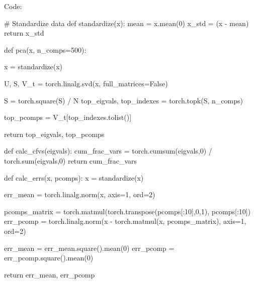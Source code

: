\documentclass[submit]{harvardml}
\begin{document}
Code:

\begin{python}
# Standardize data
def standardize(x):
    mean = x.mean(0)
    x_std = (x - mean)
    return x_std

def pca(x, n_comps=500):

    x = standardize(x)

    U, S, V_t = torch.linalg.svd(x, full_matrices=False)

    S = torch.square(S) / N
    top_eigvals, top_indexes = torch.topk(S, n_comps)

    top_pcomps = V_t[top_indexes.tolist()]
    
    return top_eigvals, top_pcomps


def calc_cfvs(eigvals):
    cum_frac_vars = torch.cumsum(eigvals,0) / torch.sum(eigvals,0)
    return cum_frac_vars





def calc_errs(x, pcomps):
    x = standardize(x)

    err_mean = torch.linalg.norm(x, axis=1, ord=2)

    pcomps_matrix = torch.matmul(torch.transpose(pcomps[:10],0,1), pcomps[:10])
    err_pcomp = torch.linalg.norm(x - torch.matmul(x, pcomps_matrix), axis=1, ord=2)

    err_mean = err_mean.square().mean(0)
    err_pcomp = err_pcomp.square().mean(0)

    return err_mean, err_pcomp
\end{python}
\end{document}
